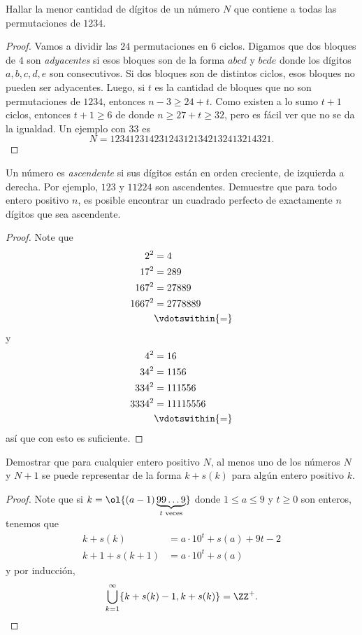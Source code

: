 \begin{probEG}
	Hallar la menor cantidad de dígitos de un número $N$ que contiene a todas las permutaciones de $1234$.
\end{probEG}

\begin{proof}
	Vamos a dividir las $24$ permutaciones en $6$ ciclos. Digamos que dos bloques de $4$ son \emph{adyacentes} si esos bloques son de la forma $abcd$ y $bcde$ donde los dígitos $a,b,c,d,e$ son consecutivos. Si dos bloques son de distintos ciclos, esos bloques no pueden ser adyacentes. Luego, si $t$ es la cantidad de bloques que no son permutaciones de $1234$, entonces $n-3\ge 24+t$. Como existen a lo sumo $t+1$ ciclos, entonces $t+1\ge 6$ de donde $n\ge 27+t\ge 32$, pero es fácil ver que no se da la igualdad. Un ejemplo con $33$ es \[N=123412314231243121342132413214321.\]
\end{proof}

\begin{probEG}
	Un número es \emph{ascendente} si sus dígitos están en orden creciente, de izquierda a derecha. Por ejemplo, $123$ y $11224$ son ascendentes. Demuestre que para todo entero positivo $n$, es posible encontrar un cuadrado perfecto de exactamente $n$ dígitos que sea ascendente.
\end{probEG}

\begin{proof}
	Note que
	\begin{align*}
		2^2&=4\\
		17^2&=289\\
		167^2&=27889\\
		1667^2&=2778889\\
		&\vdotswithin{=}
	\end{align*}
	y
	\begin{align*}
		4^2&=16\\
		34^2&=1156\\
		334^2&=111556\\
		3334^2&=11115556\\
		&\vdotswithin{=}
	\end{align*}
	así que con esto es suficiente.
\end{proof}

\begin{probEG}
	Demostrar que para cualquier entero positivo $N$, al menos uno de los números $N$ y $N+1$ se puede representar de la forma $k+s(k)$ para algún entero positivo $k$.
\end{probEG}

\begin{proof}
	Note que si $k=\ol{(a-1)\underbrace{99\dots 9}_{t\text{ veces}}}$ donde $1\le a\le 9$ y $t\ge 0$ son enteros, tenemos que
	\begin{align*}
		k+s(k)&=a\cdot 10^t+s(a)+9t-2\\
		k+1+s(k+1)&=a\cdot 10^t+s(a)
	\end{align*}
	y por inducción,
	\[\bigcup_{k=1}^\infty\{k+s(k)-1,k+s(k)\}=\ZZ^+.\]
\end{proof}
